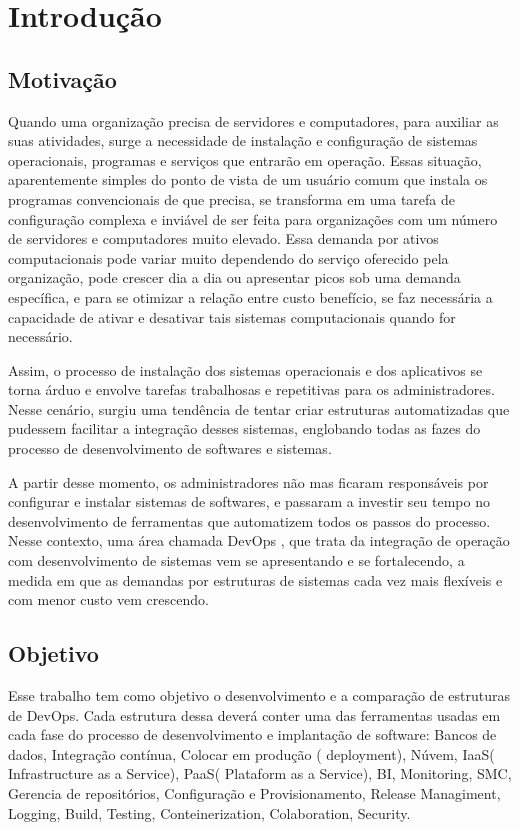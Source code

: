 \chapter{Introdução}

\section{Motivação}

Quando uma organização precisa de servidores e computadores, 
para auxiliar as suas atividades, surge a necessidade de 
instalação e configuração de sistemas operacionais, programas 
e serviços que entrarão em operação. Essas situação, 
aparentemente simples do ponto de vista de um usuário comum
que instala os programas convencionais de que precisa, se 
transforma em uma tarefa de configuração complexa e inviável 
de ser feita para organizações com um número de servidores e 
computadores muito elevado. Essa demanda por ativos 
computacionais pode variar muito dependendo do serviço 
oferecido pela organização, pode crescer dia a dia ou 
apresentar picos sob uma demanda específica, e para se 
otimizar a relação entre custo benefício, se faz necessária
a capacidade de ativar e desativar tais sistemas 
computacionais quando for necessário. 

Assim, o processo de  
instalação dos sistemas operacionais e dos aplicativos se 
torna árduo e envolve tarefas trabalhosas e repetitivas 
para os administradores. Nesse cenário, surgiu uma 
tendência de tentar criar estruturas automatizadas que 
pudessem facilitar a integração desses sistemas, englobando
todas as fazes do processo de desenvolvimento de softwares 
e sistemas. 

A partir desse momento, os administradores não 
mas ficaram responsáveis por configurar e instalar sistemas 
de softwares, e passaram a investir seu tempo no 
desenvolvimento de ferramentas que automatizem todos os 
passos do processo. Nesse contexto, uma área chamada 
DevOps \cite{loukides2012devops}, que trata  da integração 
de operação com desenvolvimento de sistemas vem se 
apresentando e se fortalecendo, a medida em que as demandas 
por estruturas de sistemas cada vez mais flexíveis e com 
menor custo vem crescendo.


\section{Objetivo}

Esse trabalho tem como objetivo o desenvolvimento e a 
comparação de estruturas de DevOps. Cada estrutura dessa 
deverá conter uma das ferramentas usadas em cada fase do 
processo de desenvolvimento e implantação de software: 
Bancos de dados, Integração contínua, Colocar em produção
( deployment), Núvem, IaaS( Infrastructure as a Service),
PaaS( Plataform as a Service), BI, Monitoring, SMC, 
Gerencia de repositórios, Configuração e Provisionamento, 
Release Managiment, Logging, Build, Testing, Conteinerization, 
Colaboration, Security.

